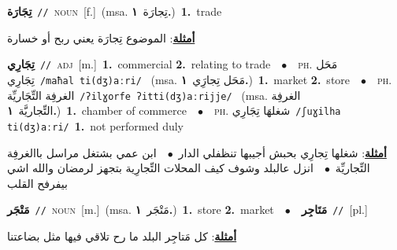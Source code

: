 \documentclass[10pt,a4paper,twoside]{article} %
\begin{document}
\begin{multicols}{2}
{\setlength\topsep{0pt}\textbf{\foreignlanguage{arabic}{تِجَارَة}}\ {\color{gray}\texttt{//}\color{black}}\ \textsc{noun}\ [f.]\ \color{gray}(msa. \foreignlanguage{arabic}{تِجارَة}~\foreignlanguage{arabic}{\textbf{١.}})\color{black}\ \textbf{1.}~trade\  \begin{flushright}\color{gray}\foreignlanguage{arabic}{\textbf{\underline{\foreignlanguage{arabic}{أمثلة}}}: الموضوع تِجارَة يعني ربح أو خسارة}\end{flushright}\color{black}} \vspace{2mm}

{\setlength\topsep{0pt}\textbf{\foreignlanguage{arabic}{تِجَارِي}}\ {\color{gray}\texttt{//}\color{black}}\ \textsc{adj}\ [m.]\ \textbf{1.}~commercial  \textbf{2.}~relating to trade\ \ $\bullet$\ \ \textsc{ph.} \color{gray} \foreignlanguage{arabic}{مَحَل تِجَارِي}\color{black}\ {\color{gray}\texttt{/{\sffamily maħal ti(dʒ)aːri}/}\color{black}}\ \color{gray} (msa. \foreignlanguage{arabic}{مَحَل تِجارَِي}~\foreignlanguage{arabic}{\textbf{١.}})\color{black}\ \textbf{1.}~market  \textbf{2.}~store\ \ $\bullet$\ \ \textsc{ph.} \color{gray} \foreignlanguage{arabic}{الغرفِة التِّجَاريِّة}\color{black}\ {\color{gray}\texttt{/{\sffamily ʔilɣorfe ʔitti(dʒ)aːrijje}/}\color{black}}\ \color{gray} (msa. \foreignlanguage{arabic}{الغرفِة التِّجاريَّة}~\foreignlanguage{arabic}{\textbf{١.}})\color{black}\ \textbf{1.}~chamber of commerce\ \ $\bullet$\ \ \textsc{ph.} \color{gray} \foreignlanguage{arabic}{شغلهَا تِجَارِي}\color{black}\ {\color{gray}\texttt{/{\sffamily ʃuɣilha ti(dʒ)aːri}/}\color{black}}\ \textbf{1.}~not performed duly\  \begin{flushright}\color{gray}\foreignlanguage{arabic}{\textbf{\underline{\foreignlanguage{arabic}{أمثلة}}}: شغلها تِجارِي بحبش أجيبها تنظفلي الدار\ $\bullet$\ \  ابن عمي بشتغل مراسل باالغرفِة التِّجاريِّة\ $\bullet$\ \  انزل عالبلد وشوف كيف المحلات التِّجارِية بتجهز لرمضان والله اشي بيفرفح القلب}\end{flushright}\color{black}} \vspace{2mm}

{\setlength\topsep{0pt}\textbf{\foreignlanguage{arabic}{مَتْجَر}}\ {\color{gray}\texttt{//}\color{black}}\ \textsc{noun}\ [m.]\ \color{gray}(msa. \foreignlanguage{arabic}{مَتْجَر}~\foreignlanguage{arabic}{\textbf{١.}})\color{black}\ \textbf{1.}~store  \textbf{2.}~market\ \ $\bullet$\ \ \setlength\topsep{0pt}\textbf{\foreignlanguage{arabic}{مَتَاجِر}}\ {\color{gray}\texttt{//}\color{black}}\ [pl.]\  \begin{flushright}\color{gray}\foreignlanguage{arabic}{\textbf{\underline{\foreignlanguage{arabic}{أمثلة}}}: كل مَتاجِر البلد ما رح تلاقي فيها مثل بضاعتنا}\end{flushright}\color{black}} \vspace{2mm}


\end{multicols}
\end{document}
